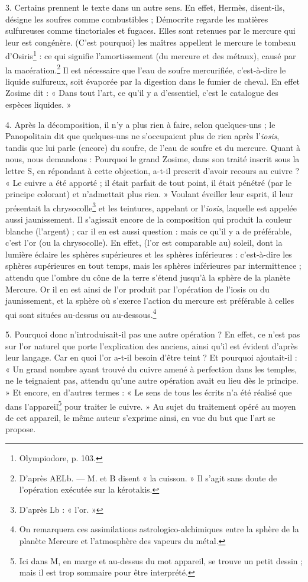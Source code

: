 \documentclass[a4paper, 11pt, oneside, polutonikogreek, french]{article}
\begin{document}
3. Certains prennent le texte dans un autre sens. En effet, Hermès, disent-ils, désigne les soufres comme combustibles ; Démocrite regarde les matières sulfureuses comme tinctoriales et fugaces. Elles sont retenues par le mercure qui leur est congénère. (C'est pourquoi) les maîtres appellent le mercure le tombeau d'Osiris\footnote{Olympiodore, p. 103.} : ce qui signifie l'amortissement (du mercure et des métaux), causé par la macération.\footnote{D'après AELb. --- M. et B disent « la cuisson. » Il s'agit sans doute de l'opération exécutée sur la kérotakis.} Il est nécessaire que l'eau de soufre mercurifiée, c'est-à-dire le liquide sulfureux, soit évaporée par la digestion dans le fumier de cheval. En effet Zosime dit : « Dans tout l'art, ce qu'il y a d'essentiel, c'est le catalogue des espèces liquides. »

4. Après la décomposition, il n'y a plus rien à faire, selon quelques-uns ; le Panopolitain dit que quelques-uns ne s'occupaient plus de rien après l'\emph{iosis}, tandis que lui parle (encore) du soufre, de l'eau de soufre et du mercure. Quant à nous, nous demandons : Pourquoi le grand Zosime, dans son traité inscrit sous la lettre S, en répondant à cette objection, a-t-il prescrit d'avoir recours au cuivre ? « Le cuivre a été apporté ; il était parfait de tout point, il était pénétré (par le principe colorant) et n'admettait plus rien. » Voulant éveiller leur esprit, il leur présentait la chrysocolle\footnote{D'après Lb : « l'or. »} et les teintures, appelant or l'\emph{iosis}, laquelle est appelée aussi jaunissement. Il s'agissait encore de la composition qui produit la couleur blanche (l'argent) ; car il en est aussi question : mais ce qu'il y a de préférable, c'est l'or (ou la chrysocolle). En effet, (l'or est comparable au) soleil, dont la lumière éclaire les sphères supérieures et les sphères inférieures : c'est-à-dire les sphères supérieures en tout temps, mais les sphères inférieures par intermittence ; attendu que l'ombre du cône de la terre s'étend jusqu'à la sphère de la planète Mercure. Or il en est ainsi de l'or produit par l'opération de l'iosis ou du jaunissement, et la sphère où s'exerce l'action du mercure est préférable à celles qui sont situées au-dessus ou au-dessous.\footnote{On remarquera ces assimilations astrologico-alchimiques entre la sphère de la planète Mercure et l'atmosphère des vapeurs du métal.}

5. Pourquoi donc n'introduisait-il pas une autre opération ? En effet, ce n'est pas sur l'or naturel que porte l'explication des anciens, ainsi qu'il est évident d'après leur langage. Car en quoi l'or a-t-il besoin d'être teint ? Et pourquoi ajoutait-il : « Un grand nombre ayant trouvé du cuivre amené à perfection dans les temples, ne le teignaient pas, attendu qu'une autre opération avait eu lieu dès le principe. » Et encore, en d'autres termes : « Le sens de tous les écrits n'a été réalisé que dans l'appareil\footnote{Ici dans M, en marge et au-dessus du mot appareil, se trouve un petit dessin ; mais il est trop sommaire pour être interprété.} pour traiter le cuivre. » Au sujet du traitement opéré au moyen de cet appareil, le même auteur s'exprime ainsi, en vue du but que l'art se propose.
\end{document}
